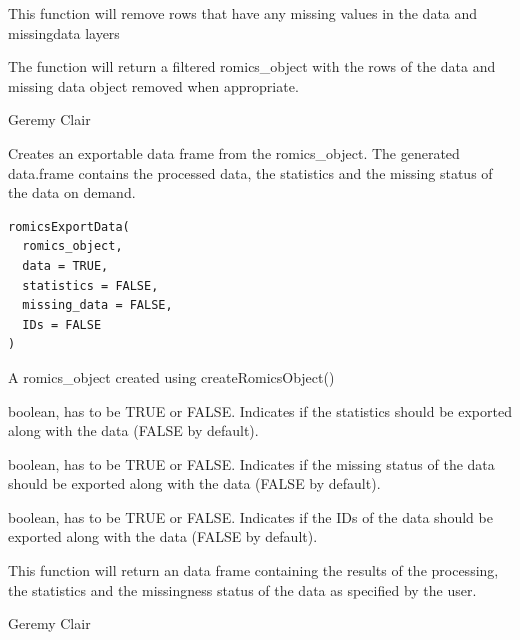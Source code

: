 \documentclass[a4paper]{book}
\begin{document}
%
\begin{Details}
This function will remove rows that have any missing values in the data and missingdata layers
\end{Details}
%
\begin{Value}
The function will return a filtered romics\_object with the rows of the data and missing data object removed when appropriate.
\end{Value}
%
\begin{Author}
Geremy Clair
\end{Author}
%
\begin{Description}
Creates an exportable data frame from the romics\_object. The generated data.frame contains the processed data, the statistics and the missing status of the data on demand.
\end{Description}
%
\begin{Usage}
\begin{verbatim}
romicsExportData(
  romics_object,
  data = TRUE,
  statistics = FALSE,
  missing_data = FALSE,
  IDs = FALSE
)
\end{verbatim}
\end{Usage}
%
\begin{Arguments}
\begin{ldescription}
\item[\code{romics\_object}] A romics\_object created using createRomicsObject()

\item[\code{statistics}] boolean, has to be TRUE or FALSE. Indicates if the statistics should be exported along with the data (FALSE by default).

\item[\code{missing\_data}] boolean, has to be TRUE or FALSE. Indicates if the missing status of the data should be exported along with the data (FALSE by default).

\item[\code{IDs}] boolean, has to be TRUE or FALSE. Indicates if the IDs of the data should be exported along with the data (FALSE by default).
\end{ldescription}
\end{Arguments}
%
\begin{Value}
This function will return an data frame containing the results of the processing, the statistics and the missingness status of the data as specified by the user.
\end{Value}
%
\begin{Author}
Geremy Clair
\end{Author}
\end{document}
